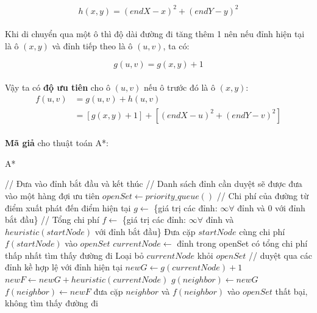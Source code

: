 $$h(x, y) = (endX - x)^2 + (endY - y)^2$$

\paragraph{}{Khi di chuyển qua một ô thì độ dài đường đi tăng thêm 1 nên nếu đỉnh hiện tại là ô $(x, y)$ và đỉnh tiếp theo là ô $(u, v)$, ta có:}

$$g(u, v) = g(x, y) + 1$$
\paragraph{}{Vậy ta có \textbf{độ ưu tiên} cho ô $(u, v)$ nếu ô trước đó là ô $(x, y)$:
\begin{align*}
f(u, v) &= g(u, v) + h(u, v) \\
&= [g(x, y) + 1] + [(endX - u)^2 + (endY - v)^2]
\end{align*}}

\paragraph{}{\textbf{Mã giả} cho thuật toán A*:}


\begin{algorithm}[H]
\caption{A*}
\label{alg:rdfs}
\begin{algorithmic}
 // Đưa vào đỉnh bắt đầu và kết thúc
\State // Danh sách đỉnh cần duyệt sẽ được đưa vào một hàng đợi ưu tiên
\State $openSet \gets priority\_queue()$
\State // Chi phí của đường  từ điểm xuất phát đến điểm hiện tại
\State $g \gets$ \{giá trị các đỉnh: $\infty \forall$ đỉnh và 0 với đỉnh bắt đầu\}
\State // Tổng chi phí 
\State $f \gets$ \{giá trị các đỉnh: $\infty \forall$ đỉnh và $heuristic(startNode)$ với đỉnh bắt đầu\}
\State
\State Đưa cặp $startNode$ cùng chi phí $f(startNode)$ vào $openSet$
\State $currentNode \gets$ đỉnh trong openSet có tổng chi phí thấp nhất
\State \Return tìm thấy đường đi
\EndIf
\State Loại bỏ $currentNode$ khỏi $openSet$
\State
\State // duyệt qua các đỉnh kề hợp lệ với đỉnh hiện tại
\State $newG \gets g(currentNode) + 1$
\State$ newF \gets newG + heuristic(currentNode)$
\State $g(neighbor) \gets newG$
\State $f(neighbor) \gets newF$
\State đưa cặp $neighbor$ và $f(neighbor)$ vào $openSet$
\EndIf
\EndFor
\EndWhile
\Return thất bại, không tìm thấy đường đi
\EndFunction
\end{algorithmic}
\end{algorithm}


